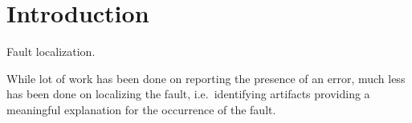 %
%
%
%
%
%

%

\section{Introduction} %

Fault localization. 

While lot of work has been done on reporting the presence of an error, much less has been done on localizing the fault, i.e.\ identifying artifacts providing a meaningful explanation for the occurrence of the fault.

